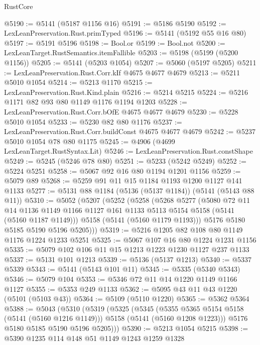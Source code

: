 \begin{lexlean}{RustCore}
\begin{coremodule}
@5190 := @5141 (@5187 @1156 @16)
@5191 := @5186 @5190
@5192 := LexLeanPreservation.Rust.primTyped
@5196 := @5141 (@5192 @55 @16 @80)
@5197 := @5191 @5196
@5198 := Bool.or
@5199 := Bool.not
@5200 := LexLeanTarget.RustSemantics.itemFallible
@5203 := @5198 (@5199 (@5200 @1156))
@5205 := @5141 (@5203 @1054)
@5207 := @5060 (@5197 @5205)
@5211 := LexLeanPreservation.Rust.Corr.kIf @4675 @4677 @4679
@5213 := @5211 @5010 @1054
@5214 := @5213 @1170
@5215 := LexLeanPreservation.Rust.Kind.plain
@5216 := @5214 @5215
@5224 := @5216 @1171 @82 @93 @80 @1149 @1176 @1194 @1203
@5228 := LexLeanPreservation.Rust.Corr.bOfE @4675 @4677 @4679
@5230 := @5228 @5010 @1054
@5233 := @5230 @82 @80 @1176
@5237 := LexLeanPreservation.Rust.Corr.buildConst @4675 @4677 @4679
@5242 := @5237 @5010 @1054 @78 @80 @1175
@5245 := @4906 (@4699 LexLeanTarget.RustSyntax.Lit)
@5246 := LexLeanPreservation.Rust.constShape
@5249 := @5245 (@5246 @78 @80)
@5251 := @5233 (@5242 @5249)
@5252 := @5224 @5251
@5258 := @5067 @92 @16 @80 @1194 @1201 @1156
@5259 := @5079 @89
@5268 := @5259 @91 @11 @15 @1184 @1193 @1200 @1127 @141 @1133
@5277 := @5131 @88 @1184 (@5136 (@5137 @1184)) (@5141 (@5143 @88 @11))
@5310 := @5052
    (@5207
      (@5252
        (@5258
          (@5268
            @5277
            (@5080
              @72
              @11
              @14
              @1136
              @1149
              @1166
              @1127
              @161
              @1133
              @5113
              @5154
              @5158
              (@5141 (@5160 @1187 @1149)))
            @5158
            (@5141 (@5160 @1179 @1193)))
          @5176
          @5180
          @5185
          @5190
          @5196
          @5205)))
@5319 := @5216 @1205 @82 @108 @80 @1149 @1176 @1224 @1233 @5251
@5325 := @5067 @107 @16 @80 @1224 @1231 @1156
@5335 := @5079 @102 @106 @11 @15 @1213 @1223 @1230 @1127 @237 @1133
@5337 := @5131 @101 @1213
@5339 := @5136 (@5137 @1213)
@5340 := @5337 @5339
@5343 := @5141 (@5143 @101 @11)
@5345 := @5335 (@5340 @5343)
@5346 := @5079 @104
@5353 := @5346 @72 @11 @14 @1220 @1149 @1166 @1127
@5355 := @5353 @249 @1133
@5362 := @5095 @43 @11 @43 @1220 (@5101 (@5103 @43))
@5364 := @5109 (@5110 @1220)
@5365 := @5362 @5364
@5388 := @5043
    (@5310
      (@5319
        (@5325
          (@5345
            (@5355 @5365 @5154 @5158 (@5141 (@5160 @1216 @1149)))
            @5158
            (@5141 (@5160 @1208 @1223)))
          @5176
          @5180
          @5185
          @5190
          @5196
          @5205)))
@5390 := @5213 @1054 @5215
@5398 := @5390 @1235 @114 @148 @51 @1149 @1243 @1259 @1328

\end{coremodule}
\end{lexlean}
